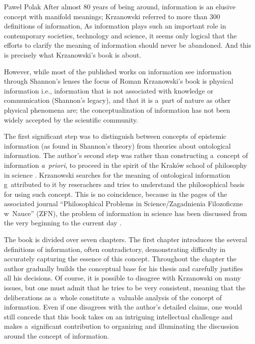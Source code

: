 \begin{newrevengenv}{Paweł Polak}
After almost 80 years of being around, information is an elusive concept with manifold meanings; Krzanowski
\parencite*[][]{krzanowski_ontological_2022} %
 referred to more than 300 definitions of information, As information plays such an important role in contemporary societies, technology and science, it seems only logical that the efforts to clarify the meaning of information should never be abandoned. And this is precisely what Krzanowski's book is about.

However, while most of the published works on information see information through Shannon's lenses the focus of Roman Krzanowski's book
\parencite[][]{krzanowski_ontological_2022} %
 is physical information i.e., information that is not associated with knowledge or communication (Shannon's legacy), and that it is a~part of nature as other physical phenomena are; the conceptualization of information has not been widely accepted by the scientific community.

The first significant step was to distinguish between concepts of epistemic information (as found in Shannon's theory) from theories about ontological information. The author's second step was rather than constructing a~concept of information \textit{a~priori}, to proceed in the spirit of the Kraków school of philosophy in science
\parencites[][]{heller_how_2019}[][]{polak_philosophy_2019}[][]{polak_krakow_2022}. %
 Krzanowski searches for the meaning of ontological information g~attributed to it by reserachers and tries to understand the philosophical basis for using such concept. This is no coincidence, because in the pages of the associated journal ``Philosophical Problems in Science/Zagadnienia Filozoficzne w~Nauce'' (ZFN), the problem of information in science has been discussed from the very beginning to the current day 
\parencites[][]{turek_filozoficzne_1978}[][]{turek_rozwazania_1981}[][]{krzanowski_minimal_2017}[][]{krzanowski_why_2020}.%


The book is divided over seven chapters. The first chapter introduces the several definitions of information, often contradictory, demonstrating difficulty in accurately capturing the essence of this concept. Throughout the chapter the author gradually builds the conceptual base for his thesis and carefully justifies all his decisions. Of course, it is possible to disagree with Krzanowski on many issues, but one must admit that he tries to be very consistent, meaning that the deliberations as a~whole constitute a~valuable analysis of the concept of information. Even if one disagrees with the author's detailed claims, one would still concede that this book takes on an intriguing intellectual challenge and makes a~significant contribution to organizing and illuminating the discussion around the concept of information.


\end{newrevengenv}
